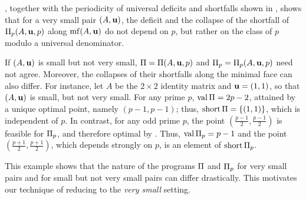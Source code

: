 \documentclass[11pt]{amsart}
\newcommand{\short}{\operatorname{short}}
\newcommand{\udeficit}{\operatorname{udeficit}}
\begin{document}

\begin{remark} \label{program behavior small: R}
   , together with the periodicity of universal deficits and shortfalls shown in , shows that for a very small pair $(A,\mathbf{u})$, the deficit and the collapse of the shortfall of  $\Pi_p(A,\mathbf{u},p)$ along $\operatorname{mf}(A, \mathbf{u})$ do not depend on $p$,  but rather on the class of $p$ modulo a universal denominator.
\end{remark}

\begin{example}
   If $(A, \mathbf{u})$ is small but not very small, $\Pi = \Pi(A,\mathbf{u},p)$ and $\Pi_p = \Pi_p(A,\mathbf{u},p)$ need not agree.
   Moreover, the collapses of their shortfalls along the minimal face can also differ.
   For instance, let $A$ be the $2 \times 2$ identity matrix and $\mathbf{u} = (1,1)$, so that $(A,\mathbf{u})$ is small, but not very small.
   For any prime $p$, $\operatorname{val} \Pi = 2p - 2$, attained by a unique optimal point, namely $(p-1,p-1)$; thus, $\short \IP = \{(1,1)\}$, which is independent of $p$.
   In contrast, for any odd prime $p$, the point $(\frac{p-1}{2}, \frac{p-1}{2})$ is feasible for $\Pi_p$, and therefore optimal by .
   Thus, $\operatorname{val} \Pi_p = p-1$ and the point $(\frac{p+1}{2}, \frac{p+1}{2})$, which depends strongly on $p$, is an element of $\short \IP_p$.

   This example shows that the nature of the programs $\Pi$ and $\Pi_p$ for very small pairs and for small but not very small pairs can differ drastically.
   This motivates our technique of reducing to the \emph{very small} setting.  
\end{example}
\end{document}
